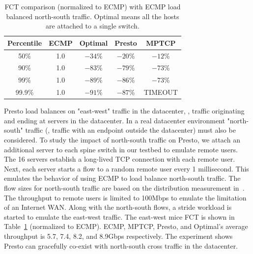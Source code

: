 \begin{table}[!htb]
\begin{center}
\begin{tabular}{ |c|c|c|c|c| }
 \hline

 Percentile & ECMP & Optimal & Presto & MPTCP \\
 \hline
 50\%       & 1.0 & $-34$\%     & $-20$\%   & $-12$\% \\
 90\%       & 1.0 & $-83$\%     & $-79$\%   & $-73$\% \\
 99\%       & 1.0 & $-89$\%     & $-86$\%   & $-73$\% \\
 99.9\%     & 1.0 & $-91$\%      & $-87$\%   & TIMEOUT \\

 \hline
\end{tabular}
\caption{FCT comparison (normalized to ECMP) with ECMP load balanced north-south traffic. Optimal means all the hosts are attached to a single  switch.}
	\label{macro_evaluation_north_south_traffic}
\end{center}
\end{table}


Presto load balances on "east-west" traffic in the datacenter, \ie{}, traffic
originating and ending at servers in the datacenter. 
In a real datacenter environment "north-south" traffic (\ie{}, traffic with an endpoint outside the datacenter)
must also be considered. 
To study the impact of north-south traffic on Presto, we attach an additional server to 
each spine switch in our testbed to emulate remote users. 
The 16 servers establish a long-lived TCP connection with each remote user. 
Next, each server starts a flow to a random remote user every 1 millisecond. This emulates  
the behavior of using ECMP to load balance north-south traffic.
The flow sizes for north-south traffic are based on the distribution measurement in~\cite{he2013next}. 
The throughput to remote users is limited to 100Mbps to emulate the limitation of an Internet WAN. 
Along with the north-south flows, 
a stride workload is started to emulate the east-west traffic. 
The east-west mice FCT is shown in Table~\ref{macro_evaluation_north_south_traffic} (normalized to ECMP). 
ECMP, MPTCP, Presto, and Optimal's average throughput is 
5.7, 7.4, 8.2, and 8.9Gbps respectively. 
The experiment shows Presto can gracefully co-exist with north-south cross traffic
in the datacenter.


